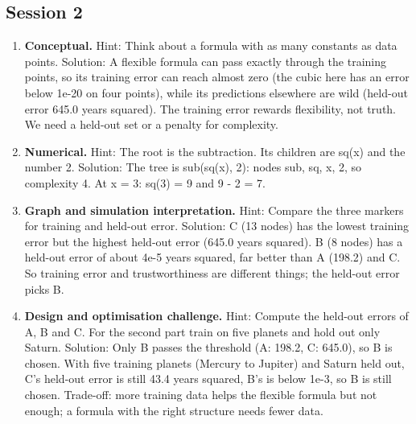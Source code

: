 \documentclass[11pt,a4paper]{article}
\begin{document}
\subsection*{Session 2}
\begin{enumerate}[nosep]
\item \textbf{Conceptual.} Hint: Think about a formula with as many constants as data points. Solution: A flexible formula can pass exactly through the training points, so its training error can reach almost zero (the cubic here has an error below 1e-20 on four points), while its predictions elsewhere are wild (held-out error 645.0 years squared). The training error rewards flexibility, not truth. We need a held-out set or a penalty for complexity.
\item \textbf{Numerical.} Hint: The root is the subtraction. Its children are sq(x) and the number 2. Solution: The tree is sub(sq(x), 2): nodes sub, sq, x, 2, so complexity 4. At x = 3: sq(3) = 9 and 9 - 2 = 7.
\item \textbf{Graph and simulation interpretation.} Hint: Compare the three markers for training and held-out error. Solution: C (13 nodes) has the lowest training error but the highest held-out error (645.0 years squared). B (8 nodes) has a held-out error of about 4e-5 years squared, far better than A (198.2) and C. So training error and trustworthiness are different things; the held-out error picks B.
\item \textbf{Design and optimisation challenge.} Hint: Compute the held-out errors of A, B and C. For the second part train on five planets and hold out only Saturn. Solution: Only B passes the threshold (A: 198.2, C: 645.0), so B is chosen. With five training planets (Mercury to Jupiter) and Saturn held out, C's held-out error is still 43.4 years squared, B's is below 1e-3, so B is still chosen. Trade-off: more training data helps the flexible formula but not enough; a formula with the right structure needs fewer data.
\end{enumerate}
\end{document}
